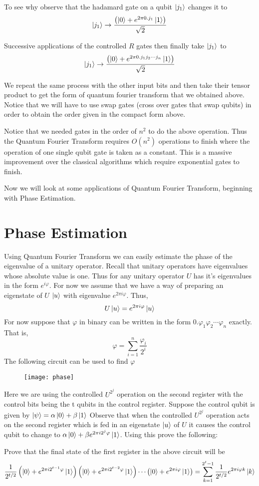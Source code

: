 To see why observe that the hadamard gate on a qubit $\ket{j_1}$ changes it to
$$\ket{j_1} \to \frac{\left( \ket{0} + e^{2\pi 0.j_1}\ket{1} \right)}{\sqrt{2}}$$

Successive applications of the controlled $R$ gates then finally take $\ket{j_1}$ to 
$$\ket{j_1} \to \frac{\left( \ket{0} + e^{2\pi 0.j_{1}j_{2}\cdots j_{n}}\ket{1} \right)}{\sqrt{2}}$$

We repeat the same process with the other input bits and then take their tensor product to get the form of quantum fourier transform that we obtained above. Notice that we will have to use swap gates (cross over gates that swap qubits) in order to obtain the order given in the compact form above.

Notice that we needed gates in the order of $n^2$ to do the above operation. Thus the Quantum Fourier Transform requires $O(n^2)$ operations to finish where the operation of one single qubit gate is taken as a constant. This is a massive improvement over the classical algorithms which require exponential gates to finish.

Now we will look at some applications of Quantum Fourier Transform, beginning with Phase Estimation.

\section{Phase Estimation}
Using Quantum Fourier Transform we can easily estimate the phase of the eigenvalue of a unitary operator. Recall that unitary operators have eigenvalues whose absolute value is one. Thus for any unitary operator $U$ has it's eigenvalues in the form $e^{i\varphi}$. For now we assume that we have a way of preparing an eigenstate of $U$ $\ket{u}$ with eigenvalue $e^{2\pi i\varphi}$. Thus,
$$ U\ket{u} = e^{2\pi i\varphi}\ket{u}$$
For now suppose that $\varphi$ in binary can be written in the form $0.\varphi_{1}\varphi_{2}\cdots\varphi_{n}$ exactly. That is,
$$\varphi = \sum_{i=1}^{n} \frac{\varphi_{i}}{2^{i}} $$ The following circuit can be used to find $\varphi$

\begin{figure}[htp]
    \centering
    \texttt{[image: phase]}
\end{figure}

Here we are using the controlled $U^{2^j}$ operation on the second register with the control bits being the t qubits in the control register. Suppose the control qubit is given by $\ket{\psi} = \alpha\ket{0} + \beta\ket{1}$ Observe that when the controlled $U^{2^j}$ operation acts on the second register which is fed in an eigenstate $\ket{u}$ of $U$ it causes the control qubit to change to $\alpha\ket{0} + \beta e^{2\pi i2^{j}\varphi}\ket{1}$. Using this prove the following:
\begin{exercise}
Prove that the final state of the first register in the above circuit will be $$\frac{1}{2^{t/2}}\left( \ket{0} + e^{2\pi i2^{t-1}\varphi}\ket{1} \right)\left( \ket{0} + e^{2\pi i2^{t-2}\varphi}\ket{1} \right) \cdots \left( \ket{0} + e^{2\pi i\varphi}\ket{1} \right) = \sum_{k=1}^{2^t - 1} \frac{1}{2^{t/2}}e^{2\pi i\varphi k}\ket{k}$$
\end{exercise}

